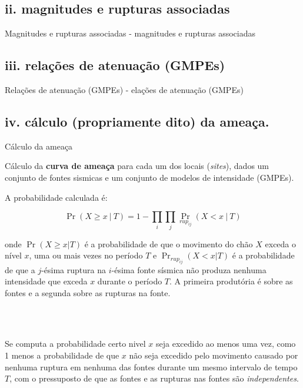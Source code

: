 \documentclass[ucs,8pt]{beamer}
\begin{document}
	\subsection{ii. magnitudes e rupturas associadas}
	\begin{frame}{Magnitudes e rupturas associadas}
		- magnitudes e rupturas associadas
	\end{frame}


	\subsection{iii. relações de atenuação (GMPEs)}
	\begin{frame}{Relações de atenuação (GMPEs)}
		- elações de atenuação (GMPEs)
	\end{frame}

	
	\subsection{iv. cálculo (propriamente dito) da ameaça.}
	\begin{frame}{Cálculo da ameaça}
	
	
	Cálculo da \textbf{curva de ameaça} para cada um dos locais (\emph{sites}), dados um
	conjunto de fontes sismicas e um conjunto de modelos de intensidade (GMPEs). 
	
	A probabilidade calculada é:
	
	\begin{equation}
	    \Pr(X \geq x ~|~ T) = 1 - \prod_i \prod_j \Pr_{rup_{ij}}(X < x ~|~ T)
	\end{equation}
    
    onde $\Pr(X \geq x | T)$ é a probabilidade de que o movimento do chão $X$
    exceda o nível $x$, uma ou mais vezes no período $T$ e $\Pr_{rup_{ij}}(X < x | T)$
 	é a probabilidade de que a $j$-ésima ruptura na $i$-ésima fonte sísmica não produza nenhuma
 	intensidade que exceda $x$ durante o período $T$. A primeira produtória é sobre as fontes
 	e a segunda sobre as rupturas na fonte.
 
	\\ ~
 
	Se computa a probabilidade certo nivel $x$ seja excedido ao menos uma vez,
	como 1 menos a probabilidade de que $x$ não seja excedido pelo movimento causado
	por nenhuma ruptura em nenhuma das fontes durante um mesmo intervalo de tempo $T$, com o 
	pressuposto de que as fontes e as rupturas nas fontes são \emph{independentes}.
		
	\end{frame}
\end{document}
